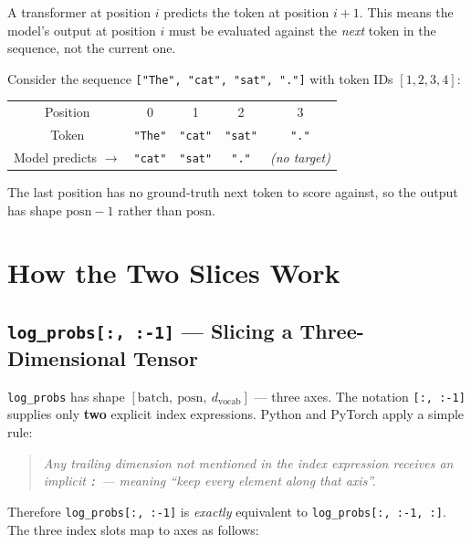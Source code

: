 \documentclass[10pt]{article}
\begin{document}
A transformer at position $i$ predicts the token at position $i+1$.
This means the model's output at position $i$ must be evaluated against
the \emph{next} token in the sequence, not the current one.

\medskip
\noindent Consider the sequence \texttt{["The", "cat", "sat", "."]} with token IDs $[1, 2, 3, 4]$:

\begin{center}
\begin{tabular}{ccccc}
\toprule
Position & 0 & 1 & 2 & 3 \\
Token & \texttt{"The"} & \texttt{"cat"} & \texttt{"sat"} & \texttt{"."} \\
\midrule
Model predicts $\to$ & \texttt{"cat"} & \texttt{"sat"} & \texttt{"."} & \textit{(no target)} \\
\bottomrule
\end{tabular}
\end{center}

\medskip
The last position has no ground-truth next token to score against, so the output
has shape $\text{posn} - 1$ rather than $\text{posn}$.

\section{How the Two Slices Work}

\subsection{\texttt{log\_probs[:, :-1]} --- Slicing a Three-Dimensional Tensor}

\texttt{log\_probs} has shape $[\text{batch},\ \text{posn},\ d_\text{vocab}]$
--- three axes.
The notation \texttt{[:, :-1]} supplies only \textbf{two} explicit index
expressions. Python and PyTorch apply a simple rule:

\begin{quote}
\textit{Any trailing dimension not mentioned in the index expression receives
an implicit \texttt{:} --- meaning ``keep every element along that axis''.}
\end{quote}

\noindent Therefore \texttt{log\_probs[:, :-1]} is \emph{exactly} equivalent
to \texttt{log\_probs[:, :-1, :]}. The three index slots map to axes as follows:
\end{document}
